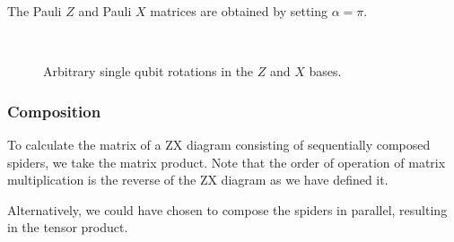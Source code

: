 The Pauli $Z$ and Pauli $X$ matrices are obtained by setting $\alpha = \pi$.
\begin{figure}[H]
\centering
{} \\[1ex]
\caption{Arbitrary single qubit rotations in the $Z$ and $X$ bases.}
\end{figure}


\subsubsection{Composition}
To calculate the matrix of a ZX diagram consisting of sequentially composed spiders, we take the matrix product. Note that the order of operation of matrix multiplication is the reverse of the ZX diagram as we have defined it.

\begin{figure}[H]
    \centering
\end{figure}

Alternatively, we could have chosen to compose the spiders in parallel, resulting in the tensor product.
\begin{figure}[H]
    \centering
\end{figure}

